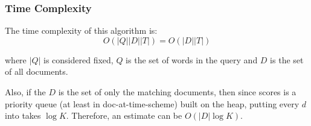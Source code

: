 \subsubsection{Time Complexity}

The time complexity of this algorithm is:
\begin{equation}
    O(|Q| |D| |T|) = O(|D| |T|)
\end{equation}

where $|Q|$ is considered fixed, $Q$ is the set of words in the query and $D$ is the set of all documents.

Also, if the $D$ is the set of only the matching documents, then
since scores is a priority queue (at least in doc-at-time-scheme) built on the heap, 
putting every $d$ into takes $\log K$. Therefore, an estimate can be $O(|D| \log K )$.~\cite{tfidfComplexity}

